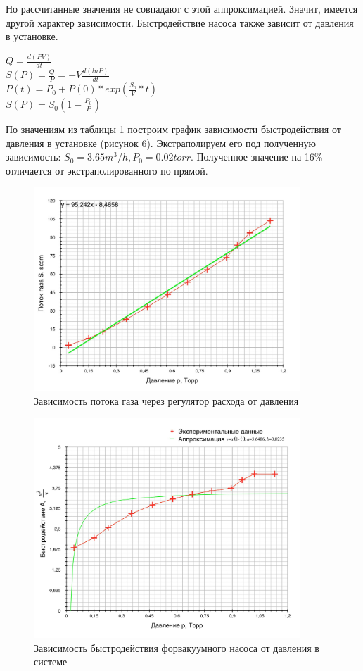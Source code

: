 \documentclass{article}
\begin{document}
Но рассчитанные значения не совпадают с этой аппроксимацией. Значит, имеется другой характер зависимости.
Быстродействие насоса также зависит от давления в установке.

\begin{center}
$Q = \frac{d(PV)}{dt}$\\
$S(P) = \frac{Q}{P}=-V\frac{d(lnP)}{dt}$\\
$P(t) = P_0+P(0)*exp(\frac{S_0}{V}*t)$\\
$S(P) = S_0(1-\frac{P_0}{P})$
\end{center}

По значениям из таблицы 1 построим график зависимости быстродействия от давления в установке (рисунок 6). Экстраполируем его под полученную зависимость: $S_0 = 3.65 m^3/h, P_0 = 0.02 torr$. Полученное значение на 16\% отличается от экстраполированного по прямой.



\begin{figure}[H]
    \centering
    \includegraphics[width=10cm]{sccm_torr.jpg}
    \caption{Зависимость потока газа через регулятор расхода от давления}
    \label{fig:vac}
\end{figure}

\begin{figure}[H]
    \centering
    \includegraphics[width=10cm]{A_torr.jpg}
    \caption{Зависимость быстродействия форвакуумного насоса от давления в системе}
    \label{fig:vac}
\end{figure}
\end{document}
